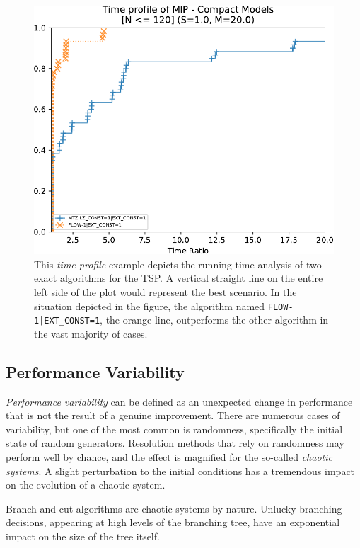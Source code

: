 \begin{figure}[t]
	\centering
	\includegraphics[width=\textwidth]{./Imgs/perfprof-tsp-example/time-ratio20.0.cropped.pdf}
	\caption{
		This \textit{time profile} example depicts the running time analysis of two exact algorithms for the TSP.
		A vertical straight line on the entire left side of the plot would represent the best scenario.
		In the situation depicted in the figure, the algorithm named \texttt{FLOW-1|EXT\_CONST=1}, the orange line, outperforms the other algorithm in the vast majority of cases.
	}
	\label{fig:example-of-time-profile-tsp}
\end{figure}

\subsection{Performance Variability}
\label{sec:performance-variability}

\textit{Performance variability} \parencite{lodi2013performance} can be defined as an unexpected change in performance that is not the result of a genuine improvement.
There are numerous cases of variability, but one of the most common is randomness, specifically the initial state of random generators.
Resolution methods that rely on randomness may perform well by chance, and the effect is magnified for the so-called \textit{chaotic systems}.
A slight perturbation to the initial conditions has a tremendous impact on the evolution of a chaotic system.

Branch-and-cut algorithms are chaotic systems by nature.
Unlucky branching decisions, appearing at high levels of the branching tree, have an exponential impact on the size of the tree itself.

